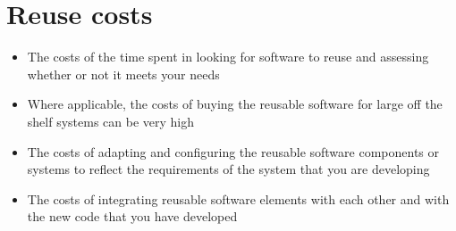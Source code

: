 \documentclass{article}[18pt]
\begin{document}
\section{Reuse costs}
\begin{itemize}
	\item The costs of the time spent in looking for software to reuse and assessing whether or not it meets your needs
	\item Where applicable, the costs of buying the reusable software for large off the shelf systems can be very high
	\item The costs of adapting and configuring the reusable software components or systems to reflect the requirements of the system that you are developing
	\item The costs of integrating reusable software elements with each other and with the new code that you have developed
\end{itemize}
\end{document}
